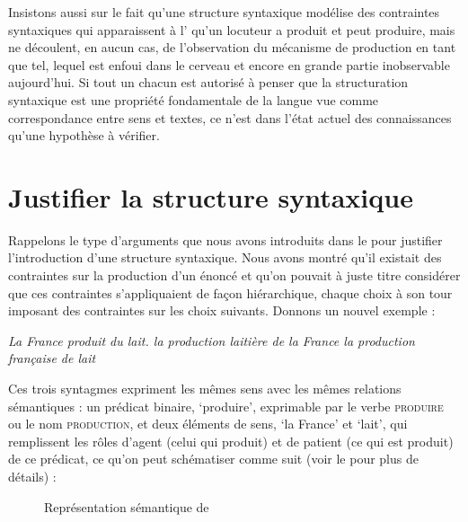 Insistons aussi sur le fait qu’une structure syntaxique modélise des contraintes syntaxiques qui apparaissent à l’ qu’un locuteur a produit et peut produire, mais ne découlent, en aucun cas, de l’observation du mécanisme de production en tant que tel, lequel est enfoui dans le cerveau et encore en grande partie inobservable aujourd’hui. Si tout un chacun est autorisé à penser que la structuration syntaxique est une propriété fondamentale de la langue vue comme correspondance entre sens et textes, ce n’est dans l’état actuel des connaissances qu’une hypothèse à vérifier.

\section{Justifier la structure syntaxique}\label{sec:3.2.1}

Rappelons le type d’arguments que nous avons introduits dans le  pour justifier l’introduction d’une structure syntaxique. Nous avons montré qu’il existait des contraintes sur la production d’un énoncé et qu’on pouvait à juste titre considérer que ces contraintes s’appliquaient de façon hiérarchique, chaque choix à son tour imposant des contraintes sur les choix suivants. Donnons un nouvel exemple :

\ea\label{ex:lait}
\ea \itshape La France produit du lait.
\ex \itshape la production laitière de la France
\ex \itshape la production française de lait
\z
\z

Ces trois syntagmes expriment les mêmes sens avec les mêmes relations sémantiques : un prédicat binaire, ‘produire’, exprimable par le verbe \textsc{produire} ou le nom \textsc{production,} et deux éléments de sens, ‘la France’ et ‘lait’, qui remplissent les rôles d’agent (celui qui produit) et de patient (ce qui est produit) de ce prédicat, ce qu’on peut schématiser comme suit (voir le  pour plus de détails) :

\begin{figure}
\caption{\label{fig:}Représentation sémantique de }
\end{figure}


